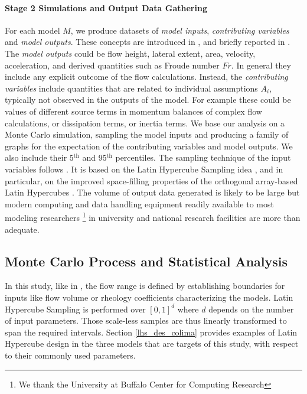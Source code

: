 \documentclass{article}
\begin{document}
\paragraph{Stage 2 Simulations and Output Data Gathering}
For each model $M$, we produce datasets of \emph{model inputs}, \emph{contributing variables} and \emph{model outputs}. These concepts are introduced in \cite{Patra2018b}, and briefly reported in \cite{Bevilacqua2019}. The \emph{model outputs} could be flow height, lateral extent, area, velocity, acceleration, and derived quantities such as Froude number $Fr$. In general they include any explicit outcome of the flow calculations. Instead, the \emph{contributing variables} include quantities that are related to individual assumptions $A_i$, typically not observed in the outputs of the model. For example these could be values of different source terms in momentum balances of complex flow calculations, or dissipation terms, or inertia terms. We base our analysis on a Monte Carlo simulation, sampling the model inputs and producing a family of graphs for the expectation of the contributing variables and model outputs. We also include their 5$^{\mathrm{th}}$ and 95$^{\mathrm{th}}$ percentiles. The sampling technique of the input variables follows \cite{Patra2018b}. It is based on the Latin Hypercube Sampling idea \citep{McKay1979,Owen1992b,Stein1987,Ranjan2014,Mingyao2016}, and in particular, on the improved space-filling properties of the orthogonal array-based Latin Hypercubes \citep{Owen1992a,Tang1993}. The volume of output data generated is likely to be large but modern computing and data handling equipment readily available to most modeling researchers \footnote{We thank the University at Buffalo Center for Computing Research} in university and national research facilities are more than adequate.

\subsection{Monte Carlo Process and Statistical Analysis}
In this study, like in \cite{Bevilacqua2019}, the flow range is defined by establishing boundaries for inputs like flow volume or rheology coefficients characterizing the models.  Latin Hypercube Sampling is performed over $[0,1]^d$ where $d$ depends on the number of  input parameters. Those scale-less samples are thus linearly  transformed to span the required intervals. Section \ref{lhs_des_colima} provides examples of Latin Hypercube design in the three models that are targets of this study, with respect to their commonly used parameters.
\end{document}
